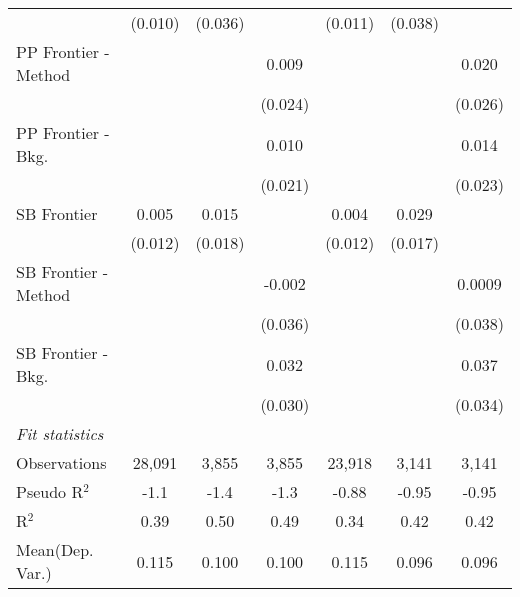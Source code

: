 \begin{tabular}{lcccccc}
                        & (0.010)      & (0.036)       &         & (0.011)      & (0.038) &   \\   
   PP Frontier - Method &              &               & 0.009   &              &         & 0.020\\   
                        &              &               & (0.024) &              &         & (0.026)\\   
   PP Frontier - Bkg.   &              &               & 0.010   &              &         & 0.014\\   
                        &              &               & (0.021) &              &         & (0.023)\\   
   SB Frontier          & 0.005        & 0.015         &         & 0.004        & 0.029   &   \\   
                        & (0.012)      & (0.018)       &         & (0.012)      & (0.017) &   \\   
   SB Frontier - Method &              &               & -0.002  &              &         & 0.0009\\   
                        &              &               & (0.036) &              &         & (0.038)\\   
   SB Frontier - Bkg.   &              &               & 0.032   &              &         & 0.037\\   
                        &              &               & (0.030) &              &         & (0.034)\\   
   \midrule
   \emph{Fit statistics}\\
   Observations         & 28,091       & 3,855         & 3,855   & 23,918       & 3,141   & 3,141\\  
   Pseudo R$^2$         & -1.1         & -1.4          & -1.3    & -0.88        & -0.95   & -0.95\\  
   R$^2$                & 0.39         & 0.50          & 0.49    & 0.34         & 0.42    & 0.42\\  
Mean(Dep. Var.) & 0.115 & 0.100 & 0.100 & 0.115 & 0.096 & 0.096 \\
   

\end{tabular}
